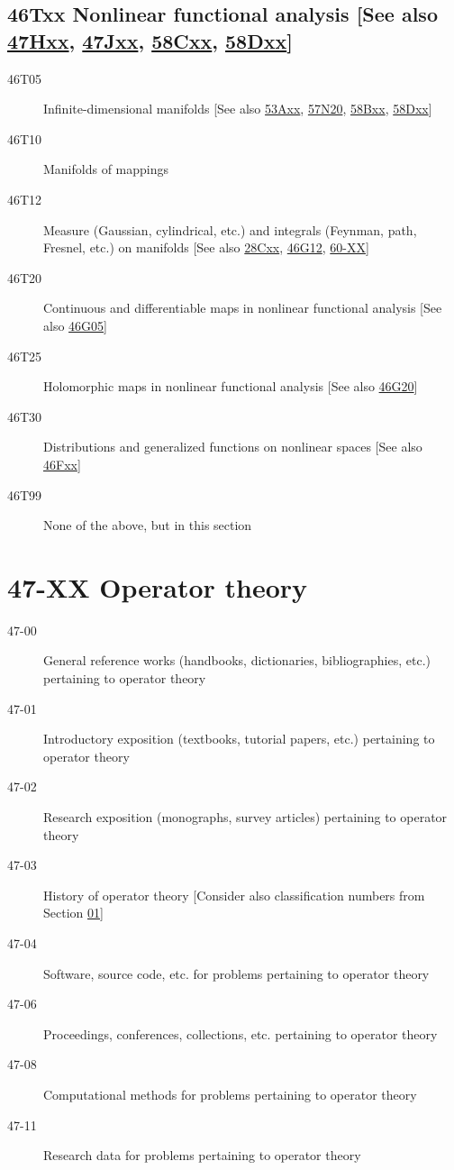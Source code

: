\documentclass[letterpaper]{article}
\begin{document}
\subsection*{46Txx  Nonlinear functional analysis [See also \hyperref[47Hxx]{47Hxx}, \hyperref[47Jxx]{47Jxx}, \hyperref[58Cxx]{58Cxx}, \hyperref[58Dxx]{58Dxx}] }\label{46Txx}
\begin{description}  
\item [46T05]\label{46T05} Infinite-dimensional manifolds [See also \hyperref[53Axx]{53Axx}, \hyperref[57N20]{57N20}, \hyperref[58Bxx]{58Bxx}, \hyperref[58Dxx]{58Dxx}]
\item [46T10]\label{46T10} Manifolds of mappings
\item [46T12]\label{46T12} Measure (Gaussian, cylindrical, etc.) and integrals (Feynman, path, Fresnel, etc.) on manifolds [See also \hyperref[28Cxx]{28Cxx}, \hyperref[46G12]{46G12}, \hyperref[60-XX]{60-XX}]
\item [46T20]\label{46T20} Continuous and differentiable maps in nonlinear functional analysis [See also \hyperref[46G05]{46G05}]
\item [46T25]\label{46T25} Holomorphic maps in nonlinear functional analysis [See also \hyperref[46G20]{46G20}]
\item [46T30]\label{46T30} Distributions and generalized functions on nonlinear spaces [See also \hyperref[46Fxx]{46Fxx}]
\item [46T99]\label{46T99} None of the above, but in this section
\end{description}
\section*{47-XX Operator theory }\label{47-XX}
\begin{description}
\item [47-00]\label{47-00} General reference works (handbooks, dictionaries, bibliographies, etc.) pertaining to operator theory
\item [47-01]\label{47-01} Introductory exposition (textbooks, tutorial papers, etc.) pertaining to operator theory
\item [47-02]\label{47-02} Research exposition (monographs, survey articles) pertaining to operator theory
\item [47-03]\label{47-03} History of operator theory [Consider also classification numbers from Section \hyperref[01-XX]{01}]
\item [47-04]\label{47-04} Software, source code, etc. for problems pertaining to operator theory
\item [47-06]\label{47-06} Proceedings, conferences, collections, etc. pertaining to operator theory
\item [47-08]\label{47-08} Computational methods for problems pertaining to operator theory
\item [47-11]\label{47-11} Research data for problems pertaining to operator theory
\end{description}
\end{document}
